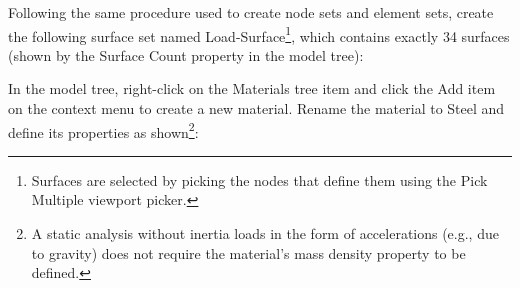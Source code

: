 \documentclass[
    11pt,        %
    a4paper,     %
    final,       %
    fleqn,       %
    notitlepage, %
    onecolumn,   %
    oneside,     %
]{article}
\begin{document}
Following the same procedure used to create node sets and element sets, create the following surface set named Load-Surface\footnote{Surfaces are selected by picking the nodes that define them using the Pick Multiple viewport picker.}, which contains exactly 34 surfaces (shown by the Surface Count property in the model tree):
\begin{center}
\end{center}

In the model tree, right-click on the Materials tree item and click the Add item on the context menu to create a new material. Rename the material to Steel and define its properties as shown\footnote{A static analysis without inertia loads in the form of accelerations (e.g., due to gravity) does not require the material's mass density property to be defined.}:
\begin{center}
\end{center}
\end{document}
